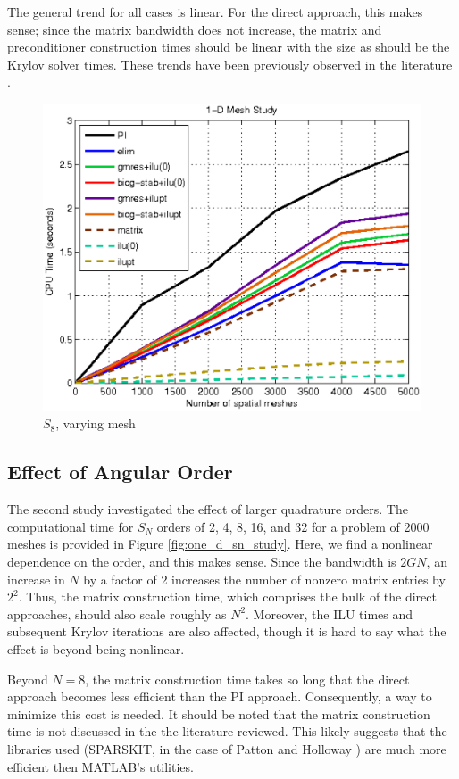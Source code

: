 \documentclass[final,3p,times,11pt]{elsarticle}
\begin{document}
  The general trend for all cases is linear.  For the direct approach, this makes sense; since the matrix bandwidth does not increase, the matrix and preconditioner construction times should be linear with the size as should be the Krylov solver times.  These trends have been previously observed in the literature \cite{patton2002apg}.

  \begin{figure}[!]  
      \centering
      \includegraphics[keepaspectratio, width = 4.5 in]{one_d_mesh_study}
      \caption{$S_8$, varying mesh}
      \label{fig:one_d_mesh_study}
  \end{figure}

\subsection{Effect of Angular Order}
  The second study investigated the effect of larger quadrature orders.  The computational time for $S_N$ orders of 2, 4, 8, 16, and 32 for a problem of 2000 meshes is provided in Figure \ref{fig:one_d_sn_study}.  Here, we find a nonlinear dependence on the order, and this makes sense\cite{patton2002apg}.  Since the bandwidth is $2GN$, an increase in $N$ by a factor of 2 increases the number of nonzero matrix entries by $2^2$.  Thus, the matrix construction time, which comprises the bulk of the direct approaches, should also scale roughly as $N^2$.  Moreover, the ILU times and subsequent Krylov iterations are also affected, though it is hard to say what the effect is beyond being nonlinear.

  Beyond $N=8$, the matrix construction time takes so long that the direct approach becomes less efficient than the PI approach.  Consequently, a way to minimize this cost is needed.  It should be noted that the matrix construction time is not discussed in the the literature reviewed.  This likely suggests that the libraries used (SPARSKIT, in the case of Patton and Holloway \cite{patton2002apg}) are much more efficient then MATLAB's utilities.
  
\end{document}
